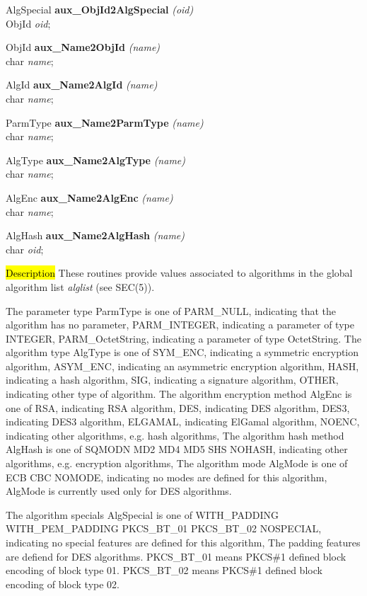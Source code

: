 AlgSpecial {\bf aux\_ObjId2AlgSpecial} {\em (oid)}  \\
ObjId {\em *oid};

ObjId {\bf *aux\_Name2ObjId} {\em (name)}  \\
char {\em *name};

AlgId {\bf *aux\_Name2AlgId} {\em (name)}  \\
char {\em *name};

ParmType {\bf aux\_Name2ParmType} {\em (name)} \\
char {\em *name};

AlgType {\bf aux\_Name2AlgType} {\em (name)}  \\
char {\em *name};

AlgEnc {\bf aux\_Name2AlgEnc} {\em (name)}  \\
char {\em *name};

AlgHash {\bf aux\_Name2AlgHash} {\em (name)}  \\
char {\em *oid};

\hl{Description}
These routines provide values associated to algorithms in the global
algorithm list {\em alglist} (see SEC(5)).

The parameter type ParmType is one of 
\bi
\m PARM\_NULL, indicating that the algorithm has no parameter,
\m PARM\_INTEGER, indicating a parameter of type INTEGER,
\m PARM\_OctetString, indicating a parameter of type OctetString.
\ei
The algorithm type AlgType is one of                                                   
\bi
\m SYM\_ENC, indicating a symmetric encryption algorithm,
\m ASYM\_ENC, indicating an asymmetric encryption algorithm,
\m HASH, indicating a hash algorithm,
\m SIG, indicating a signature algorithm,
\m OTHER, indicating other type of algorithm.
\ei
The algorithm encryption method AlgEnc is one of 
\bi
\m RSA, indicating RSA algorithm,
\m DES, indicating DES algorithm,
\m DES3, indicating DES3 algorithm,
\m ELGAMAL, indicating ElGamal algorithm,
\m NOENC, indicating other algorithms, e.g. hash algorithms,
\ei
The algorithm hash method AlgHash is one of 
\bi
\m SQMODN
\m MD2
\m MD4
\m MD5
\m SHS
\m NOHASH, indicating other algorithms, e.g. encryption algorithms,
\ei
The algorithm mode AlgMode is one of 
\bi
\m ECB
\m CBC
\m NOMODE, indicating no modes are defined for this algorithm,
\ei
AlgMode is currently used only for DES algorithms.

The algorithm specials AlgSpecial is one of 
\bi
\m WITH\_PADDING
\m WITH\_PEM\_PADDING
\m PKCS\_BT\_01
\m PKCS\_BT\_02
\m NOSPECIAL, indicating no special features are defined for this algorithm,
\ei
The padding features are defiend for DES algorithms. PKCS\_BT\_01 means PKCS\#1
defined block encoding of block type 01. PKCS\_BT\_02 means PKCS\#1 defined block
encoding of block type 02.

